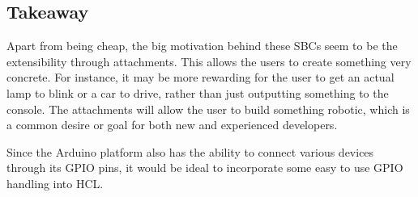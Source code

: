 \subsection{Takeaway}
Apart from being cheap, the big motivation behind these SBCs seem to be the extensibility through attachments. 
This allows the users to create something very concrete. 
For instance, it may be more rewarding for the user to get an actual lamp to blink or a car to drive, rather than just outputting something to the console. 
The attachments will allow the user to build something robotic, which is a common desire or goal for both new and experienced developers\cite{EducationalRobotics}.

Since the Arduino platform also has the ability to connect various devices through its GPIO pins, it would be ideal to incorporate some easy to use GPIO handling into HCL.
